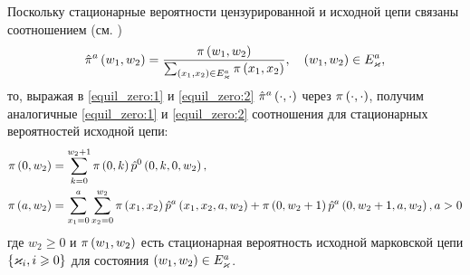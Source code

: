 \documentclass[a4paper,14pt,russian]{article}
\newcommand{\Markk}[0]{\brrr{ \vk_i, i \geqslant 0}}
\newcommand{\p}{\hat{p}}
\begin{document}
Поскольку стационарные вероятности цензурированной и исходной цепи связаны соотношением (см. \cite[с. 142]{Kemeny})
\begin{equation*}
 \hat{\pi}^a \left(w_1, w_2\right) = \frac{\pi \left(w_1, w_2\right)}{\sum_{\left(x_1,x_2\right) \in E^a_{\varkappa}}{\pi \left(x_1, x_2\right)}}, \quad \left(w_1,w_2\right) \in E^a_{\varkappa},
\end{equation*}
то, выражая в  \eqref{equil_zero:1} и \eqref{equil_zero:2} $\hat{\pi}^a \left(\cdot, \cdot\right)$ через $\pi \left(\cdot, \cdot\right)$, 
получим аналогичные \eqref{equil_zero:1} и \eqref{equil_zero:2} соотношения для стационарных вероятностей исходной цепи:
\begin{align}
\pi \br{0,w_2} &= \sum_{k = 0}^{w_2 +1} \pi\br{0,k} \hat{p}^0\br{0,k,0,w_2}, \label{equil_zero:3}\\
\pi \br{a, w_2} &= \sum_{x_1 = 0}^{a}\sum_{x_2 = 0}^{w_2} \pi\br{x_1,x_2} \p^a\br{x_1,x_2,a,w_2} +
\pi\br{0,w_2 + 1} \p^a\br{0,w_2 + 1,a,w_2}, a > 0
 \label{equil_zero:4}
\end{align}
где $w_2 \geqslant 0$ и $\pi \left(w_1, w_2\right)$ есть стационарная вероятность исходной марковской цепи $\Markk$ для состояния $\left(w_1,w_2\right)\in E_{\varkappa}^a$.
\end{document}
